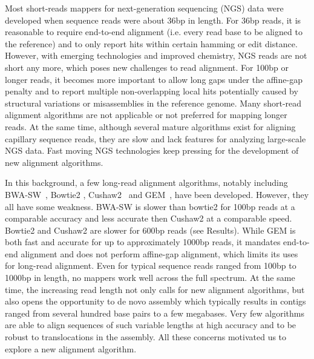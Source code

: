 \documentclass{bioinfo}
\begin{document}
Most short-reads mappers for next-generation sequencing (NGS) data were
developed when sequence reads were about 36bp in length. For 36bp reads, it is
reasonable to require end-to-end alignment (i.e. every read base to be aligned
to the reference) and to only report hits within certain hamming or edit
distance.  However, with emerging technologies and improved chemistry, NGS
reads are not short any more, which poses new challenges to read alignment. For
100bp or longer reads, it becomes more important to allow long gaps under the affine-gap
penalty and to report multiple non-overlapping local hits potentially caused by
structural variations or misassemblies in the reference genome. Many short-read
alignment algorithms are not applicable or not preferred for mapping longer
reads. At the same time, although several mature algorithms exist for aligning
capillary sequence reads, they are slow and lack features for analyzing
large-scale NGS data. Fast moving NGS technologies keep pressing for the
development of new alignment algorithms.

In this background, a few long-read alignment algorithms, notably including
BWA-SW~\citep{Li:2010fk}, Bowtie2 \citep{Langmead:2012fk},
Cushaw2~\citep{Liu:2012uq} and GEM~\citep{Marco-Sola:2012kx}, have been
developed. However, they all have some weakness. BWA-SW is slower than bowtie2
for 100bp reads at a comparable accuracy and less accurate then Cushaw2 at a
comparable speed. Bowtie2 and Cushaw2 are slower for 600bp reads (see Results).
While GEM is both fast and accurate for up to approximately 1000bp reads, it
mandates end-to-end alignment and does not perform affine-gap alignment, which
limits its uses for long-read alignment. Even for typical sequence reads ranged
from 100bp to 1000bp in length, no mappers work well across the full spectrum.
At the same time, the increasing read length not only calls for new alignment
algorithms, but also opens the opportunity to de novo assembly which typically
results in contigs ranged from several hundred base pairs to a few megabases.
Very few algorithms are able to align sequences of such variable lengths
at high accuracy and to be robust to translocations in the assembly. All these
concerns motivated us to explore a new alignment algorithm.
\end{document}
